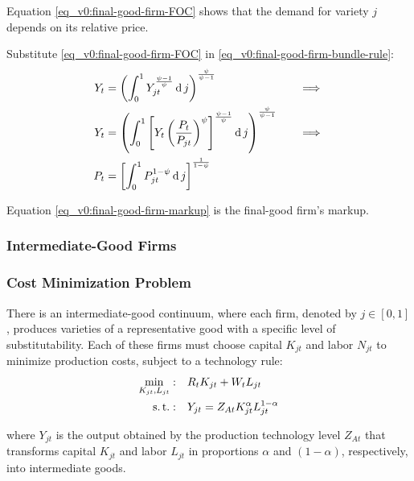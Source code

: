 \documentclass[
thesis.tex
]{subfiles}
\begin{document}
	Equation \ref{eq_v0:final-good-firm-FOC} shows that the demand for variety $j$ depends on its relative price. 
	
	Substitute \ref{eq_v0:final-good-firm-FOC} in \ref{eq_v0:final-good-firm-bundle-rule}:
	\begin{alignat}{2}
		Y_t & = \left( \int_{0}^{1} Y_{jt}^{\frac{\psi-1}{\psi}} \operatorname{d} j \right)^{\frac{\psi}{\psi-1}} &\implies \nonumber \\
		Y_t & = \left( \int_{0}^{1} \left[ Y_t \left( \frac{P_t}{P_{jt}} \right)^{\psi} \right]^{\frac{\psi-1}{\psi}} \operatorname{d} j \right)^{\frac{\psi}{\psi-1}} \quad &\implies \nonumber \\
		P_t & = \left[ \int_{0}^{1} P_{jt}^{1-\psi} \operatorname{d} j \right]^{\frac{1}{1-\psi}} \label{eq_v0:final-good-firm-markup}
	\end{alignat}
	
	Equation \ref{eq_v0:final-good-firm-markup} is the final-good firm's markup.
	
	
	\subsubsection{Intermediate-Good Firms}
	
	\subsubsection*{Cost Minimization Problem}
	
	There is an intermediate-good continuum, where each firm, denoted by $j \in [0,1]$, produces varieties of a representative good with a specific level of substitutability. Each of these firms must choose capital $K_{jt}$ and labor $N_{jt}$ to minimize production costs, subject to a technology rule:
	\begin{align}
		\label{eq_v0:int-good-firm-total-cost}
		\min_{K_{jt}, L_{jt}}: \quad & R_t K_{jt} + W_t L_{jt} \\
		\label{eq_v0:int-good-firm-production-function}
		\operatorname{s.t.}: \quad & Y_{jt} = Z_{At} K_{jt}^\alpha L_{jt}^{1-\alpha}
	\end{align}
	
	where $Y_{jt}$ is the output obtained by the production technology level $Z_{At}$\footnotemark{} that transforms capital $K_{jt}$ and labor $L_{jt}$ in proportions $\alpha$ and $(1-\alpha)$, respectively, into intermediate goods.
	
\end{document}
